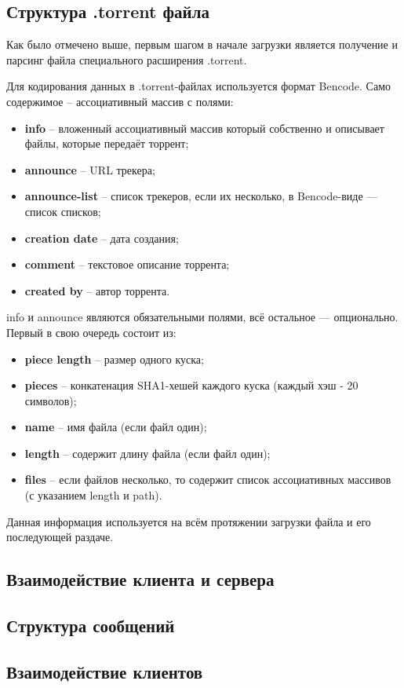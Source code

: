 \subsection{Структура .torrent файла}
Как было отмечено выше, первым шагом в начале загрузки является получение и парсинг файла специального расширения .torrent.

Для кодирования данных в .torrent-файлах используется формат Bencode. Само содержимое -- ассоциативный массив с полями:
\begin{itemize}
	\item \textbf{info} -- вложенный ассоциативный массив который собственно и описывает файлы, которые передаёт торрент;
	
	\item \textbf{announce} -- URL трекера;
	
	\item \textbf{announce-list} -- список трекеров, если их несколько, в Bencode-виде — список списков;
	
	\item \textbf{creation date} -- дата создания;
	
	\item \textbf{comment} -- текстовое описание торрента;
	
	\item \textbf{created by} -- автор торрента. \\
\end{itemize}

info и announce являются обязательными полями, всё остальное — опционально. Первый в свою очередь состоит из:
\begin{itemize}
	\item \textbf{piece length} -- размер одного куска;
	
	\item \textbf{pieces} -- конкатенация SHA1-хешей каждого куска (каждый хэш - 20 символов);
	
	\item \textbf{name} -- имя файла (если файл один);
	
	\item \textbf{length} -- содержит длину файла (если файл один);
	
	\item \textbf{files} -- если файлов несколько, то содержит список ассоциативных массивов (с указанием length и path). \\
\end{itemize}

Данная информация используется на всём протяжении загрузки файла и его последующей раздаче. \newline

\subsection{Взаимодействие клиента и сервера}





\subsection{Структура сообщений}




\subsection{Взаимодействие клиентов}

